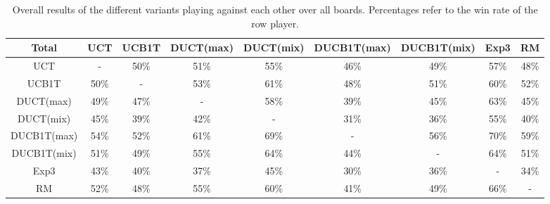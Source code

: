 \documentclass{article}
\begin{document}
\begin{table}[h!]\scriptsize
\centering
\begin{tabular}{|c||c|c|c|c|c|c|c|c|}
									\hline
  Total 	     	& UCT 	& UCB1T		& DUCT(max)	& DUCT(mix)	& DUCB1T(max)	& DUCB1T(mix)	& Exp3	& RM				\\ 	
  \hline
  \hline
   UCT &    - & 50\% & 51\% & 55\% & 46\% & 49\% & 57\% & 48\% \\ \hline 
 UCB1T & 50\% &    - & 53\% & 61\% & 48\% & 51\% & 60\% & 52\% \\ \hline 
   DUCT(max) & 49\% & 47\% &    - & 58\% & 39\% & 45\% & 63\% & 45\% \\ \hline 
   DUCT(mix) & 45\% & 39\% & 42\% &    - & 31\% & 36\% & 55\% & 40\% \\ \hline 
 DUCB1T(max) & 54\% & 52\% & 61\% & 69\% &    - & 56\% & 70\% & 59\% \\ \hline 
 DUCB1T(mix) & 51\% & 49\% & 55\% & 64\% & 44\% &    - & 64\% & 51\% \\ \hline 
      Exp3 & 43\% & 40\% & 37\% & 45\% & 30\% & 36\% &    - & 34\% \\ \hline 
        RM & 52\% & 48\% & 55\% & 60\% & 41\% & 49\% & 66\% &    - \\ \hline 
\end{tabular}
\caption{Overall results of the different variants playing against each other over all boards.
Percentages refer to the win rate of the row player. }
\label{table:round_robin_total}
\end{table}
\end{document}
